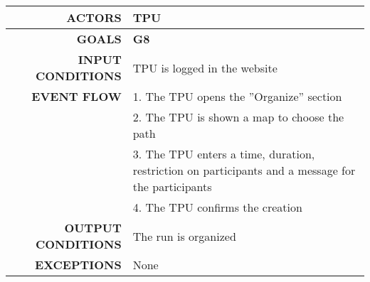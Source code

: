 \begin{table}[h!]
\begin{tabular}{|r|p{3in}|}
\hline
\textbf{ACTORS} & TPU\\
\hline
\textbf{GOALS} & \textbf{G8} \\
\hline
\textbf{INPUT CONDITIONS} & TPU is logged in the website \\
\hline
\textbf{EVENT FLOW} 
&1. The TPU opens the ''Organize'' section \\
&2. The TPU is shown a map to choose the path\\
&3. The TPU enters a time, duration, restriction on participants and a message for the participants \\
&4. The TPU confirms the creation\\
\hline
\textbf{OUTPUT CONDITIONS} & The run is organized \\
\hline
\textbf{EXCEPTIONS} 
& None \\
\hline
\end{tabular}
\end{table}